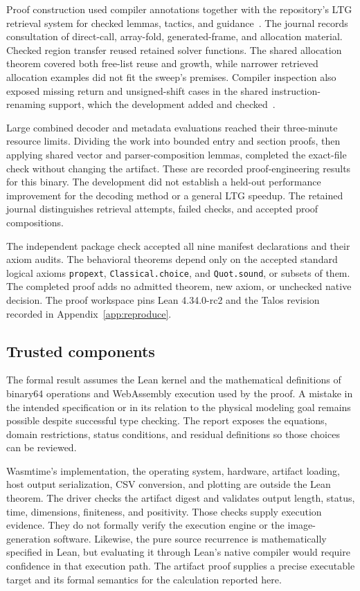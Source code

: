 \documentclass[11pt]{article}
\newcommand{\code}[1]{\texttt{#1}}
\begin{document}
Proof construction used compiler annotations together with the repository's LTG retrieval system for checked lemmas, tactics, and guidance~\cite{ltg}.  The journal records consultation of direct-call, array-fold, generated-frame, and allocation material.  Checked region transfer reused retained solver functions.  The shared allocation theorem covered both free-list reuse and growth, while narrower retrieved allocation examples did not fit the sweep's premises.  Compiler inspection also exposed missing return and unsigned-shift cases in the shared instruction-renaming support, which the development added and checked~\cite{journal}.

Large combined decoder and metadata evaluations reached their three-minute resource limits.  Dividing the work into bounded entry and section proofs, then applying shared vector and parser-composition lemmas, completed the exact-file check without changing the artifact.  These are recorded proof-engineering results for this binary.  The development did not establish a held-out performance improvement for the decoding method or a general LTG speedup.  The retained journal distinguishes retrieval attempts, failed checks, and accepted proof compositions.

The independent package check accepted all nine manifest declarations and their axiom audits.  The behavioral theorems depend only on the accepted standard logical axioms \code{propext}, \code{Classical.choice}, and \code{Quot.sound}, or subsets of them.  The completed proof adds no admitted theorem, new axiom, or unchecked native decision.  The proof workspace pins Lean 4.34.0-rc2 and the Talos revision recorded in Appendix~\ref{app:reproduce}.

\subsection{Trusted components}

The formal result assumes the Lean kernel and the mathematical definitions of binary64 operations and WebAssembly execution used by the proof.  A mistake in the intended specification or in its relation to the physical modeling goal remains possible despite successful type checking.  The report exposes the equations, domain restrictions, status conditions, and residual definitions so those choices can be reviewed.

Wasmtime's implementation, the operating system, hardware, artifact loading, host output serialization, CSV conversion, and plotting are outside the Lean theorem.  The driver checks the artifact digest and validates output length, status, time, dimensions, finiteness, and positivity.  Those checks supply execution evidence.  They do not formally verify the execution engine or the image-generation software.  Likewise, the pure source recurrence is mathematically specified in Lean, but evaluating it through Lean's native compiler would require confidence in that execution path.  The artifact proof supplies a precise executable target and its formal semantics for the calculation reported here.
\end{document}
